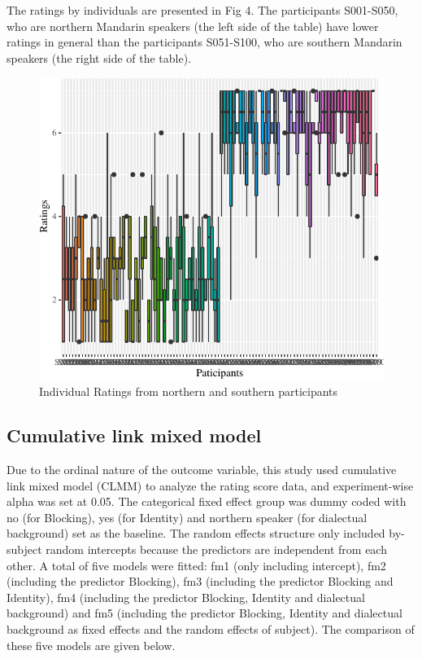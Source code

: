 \documentclass[
  english,
  man,floatsintext]{apa6}
\begin{document}
The ratings by individuals are presented in Fig 4. The participants S001-S050, who are northern Mandarin speakers (the left side of the table) have lower ratings in general than the participants S051-S100, who are southern Mandarin speakers (the right side of the table).

\begin{figure}

{\centering \includegraphics{manuscript_files/figure-latex/plot14-1} 

}

\caption{Individual Ratings from northern and southern participants}\label{fig:plot14}
\end{figure}

\hypertarget{cumulative-link-mixed-model}{%
\subsection{Cumulative link mixed model}\label{cumulative-link-mixed-model}}

Due to the ordinal nature of the outcome variable, this study used cumulative link mixed model (CLMM) to analyze the rating score data, and experiment-wise alpha was set at 0.05. The categorical fixed effect group was dummy coded with no (for Blocking), yes (for Identity) and northern speaker (for dialectual background) set as the baseline. The random effects structure only included by-subject random intercepts because the predictors are independent from each other. A total of five models were fitted: fm1 (only including intercept), fm2 (including the predictor Blocking), fm3 (including the predictor Blocking and Identity), fm4 (including the predictor Blocking, Identity and dialectual background) and fm5 (including the predictor Blocking, Identity and dialectual background as fixed effects and the random effects of subject). The comparison of these five models are given below.
\end{document}
